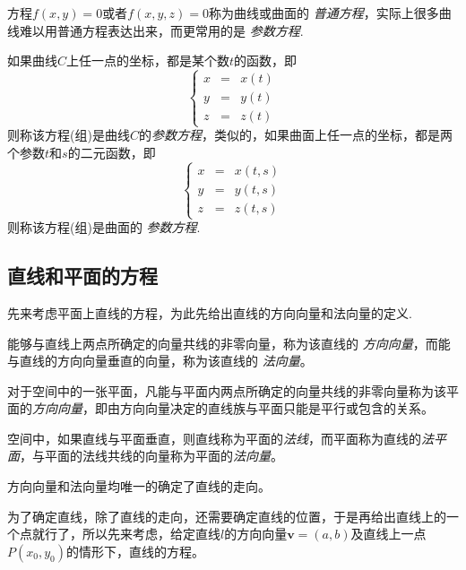 方程$f(x,y)=0$或者$f(x,y,z)=0$称为曲线或曲面的 \emph{普通方程}，实际上很多曲线难以用普通方程表达出来，而更常用的是 \emph{参数方程}.

\begin{definition}
  如果曲线$C$上任一点的坐标，都是某个数$t$的函数，即
  \[ \left\{
      \begin{array}{lll}
        x & = & x(t) \\
        y & = & y(t) \\
        z & = & z(t)
      \end{array}
    \right. \]
  则称该方程(组)是曲线$C$的\emph{参数方程}，类似的，如果曲面上任一点的坐标，都是两个参数$t$和$s$的二元函数，即
  \[ \left\{
      \begin{array}{lll}
        x & = & x(t, s) \\
        y & = & y(t, s) \\
        z & = & z(t, s)
      \end{array}
    \right. \]
  则称该方程(组)是曲面的 \emph{参数方程}.
\end{definition}

\subsection{直线和平面的方程}
\label{sec:equation-of-line-and-plane}

先来考虑平面上直线的方程，为此先给出直线的方向向量和法向量的定义.

\begin{definition}
  能够与直线上两点所确定的向量共线的非零向量，称为该直线的 \emph{方向向量}，而能与直线的方向向量垂直的向量，称为该直线的 \emph{法向量}。
\end{definition}

\begin{definition}
  对于空间中的一张平面，凡能与平面内两点所确定的向量共线的非零向量称为该平面的\emph{方向向量}，即由方向向量决定的直线族与平面只能是平行或包含的关系。
\end{definition}

\begin{definition}
  空间中，如果直线与平面垂直，则直线称为平面的\emph{法线}，而平面称为直线的\emph{法平面}，与平面的法线共线的向量称为平面的\emph{法向量}。
\end{definition}

方向向量和法向量均唯一的确定了直线的走向。

为了确定直线，除了直线的走向，还需要确定直线的位置，于是再给出直线上的一个点就行了，所以先来考虑，给定直线$l$的方向向量$\bm{v}=(a,b)$及直线上一点$P(x_0,y_0)$的情形下，直线的方程。

